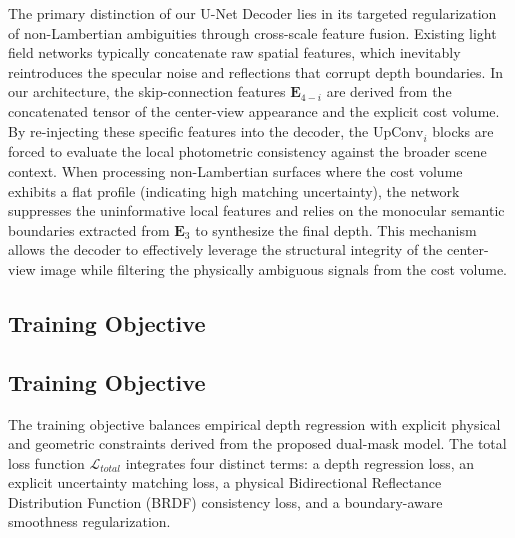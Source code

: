 \documentclass[lettersize,journal]{IEEEtran}
\begin{document}
The primary distinction of our U-Net Decoder lies in its targeted regularization of non-Lambertian ambiguities through cross-scale feature fusion. Existing light field networks \cite{heber2018} \cite{lyu2022} typically concatenate raw spatial features, which inevitably reintroduces the specular noise and reflections that corrupt depth boundaries. In our architecture, the skip-connection features $\mathbf{E}_{4-i}$ are derived from the concatenated tensor of the center-view appearance and the explicit cost volume. By re-injecting these specific features into the decoder, the $\text{UpConv}_i$ blocks are forced to evaluate the local photometric consistency against the broader scene context. When processing non-Lambertian surfaces where the cost volume exhibits a flat profile (indicating high matching uncertainty), the network suppresses the uninformative local features and relies on the monocular semantic boundaries extracted from $\mathbf{E}_3$ to synthesize the final depth. This mechanism allows the decoder to effectively leverage the structural integrity of the center-view image while filtering the physically ambiguous signals from the cost volume.

\subsection{Training Objective}

\subsection{Training Objective}
The training objective balances empirical depth regression with explicit physical and geometric constraints derived from the proposed dual-mask model. The total loss function $\mathcal{L}_{total}$ integrates four distinct terms: a depth regression loss, an explicit uncertainty matching loss, a physical Bidirectional Reflectance Distribution Function (BRDF) consistency loss, and a boundary-aware smoothness regularization.
\end{document}
